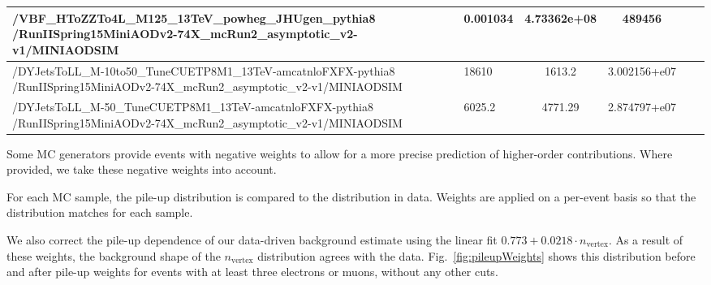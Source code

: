 \begin{table}
\begin{tabular}{p{14cm} l c c c l}
\hline
/VBF\_HToZZTo4L\_M125\_13TeV\_powheg\_JHUgen\_pythia8 \newline /RunIISpring15MiniAODv2-74X\_mcRun2\_asymptotic\_v2-v1/MINIAODSIM	& 0.001034	& 4.73362e+08	& 489456\\
\hline
/DYJetsToLL\_M-10to50\_TuneCUETP8M1\_13TeV-amcatnloFXFX-pythia8 \newline /RunIISpring15MiniAODv2-74X\_mcRun2\_asymptotic\_v2-v1/MINIAODSIM	& 18610	& 1613.2	& 3.002156+e07\\
\hline
/DYJetsToLL\_M-50\_TuneCUETP8M1\_13TeV-amcatnloFXFX-pythia8 \newline /RunIISpring15MiniAODv2-74X\_mcRun2\_asymptotic\_v2-v1/MINIAODSIM	& 6025.2	& 4771.29	& 2.874797+e07\\

\end{tabular}
\end{table}

Some MC generators provide events with negative weights to allow for a more precise prediction of higher-order contributions. Where provided, we take these negative weights into account.

For each MC sample, the pile-up distribution is compared to the distribution in data. Weights are applied on a per-event basis so that the distribution matches for each sample.

We also correct the pile-up dependence of our data-driven background estimate using the linear fit $0.773 + 0.0218 \cdot n_\textrm{vertex}$. As a result of these weights, the background shape of the $n_\textrm{vertex}$ distribution agrees with the data. Fig.~\ref{fig:pileupWeights} shows this distribution before and after pile-up weights for events with at least three electrons or muons, without any other cuts.

